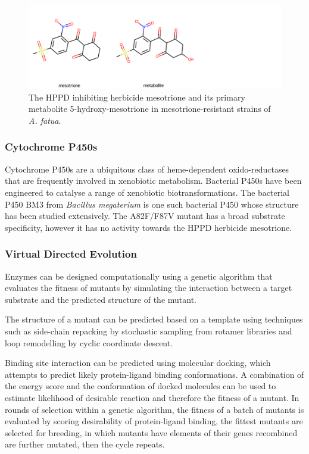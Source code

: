\documentclass[16pt]{article}
\begin{document}
\begin{figure}
	\includegraphics[width=\textwidth]{img/mesotrione+metabolite.png}
	\caption{\label{mesotrione} The HPPD inhibiting herbicide mesotrione and its primary metabolite 5-hydroxy-mesotrione in mesotrione-resistant strains of \textit{A. fatua}.}
\end{figure}

\subsubsection{Cytochrome P450s}
Cytochrome P450s are a ubiquitous class of heme-dependent oxido-reductases that are frequently involved in xenobiotic metabolism. %
Bacterial P450s have been engineered to catalyse a range of xenobiotic biotransformations. 
The bacterial P450 BM3 from \textit{Bacillus megaterium} is one such bacterial P450 whose structure has been studied extensively. 
The A82F/F87V mutant has a broad substrate specificity, however it has no activity towards the HPPD herbicide mesotrione. %

\subsubsection{Virtual Directed Evolution}
Enzymes can be designed computationally using a genetic algorithm that evaluates the fitness of mutants by simulating the interaction between a target substrate and the predicted structure of the mutant. %

The structure of a mutant can be predicted based on a template using techniques such as side-chain repacking by stochastic sampling from rotamer libraries and loop remodelling by cyclic coordinate descent. %

Binding site interaction can be predicted using molecular docking, which attempts to predict likely protein-ligand binding conformations. 
A combination of the energy score and the conformation of docked molecules can be used to estimate likelihood of desirable reaction and therefore the fitness of a mutant. %
In rounds of selection within a genetic algorithm, the fitness of a batch of mutants is evaluated by scoring desirability of protein-ligand binding, the fittest mutants are selected for breeding, in which mutants have elements of their genes recombined are further mutated, then the cycle repeats.   %
\end{document}
